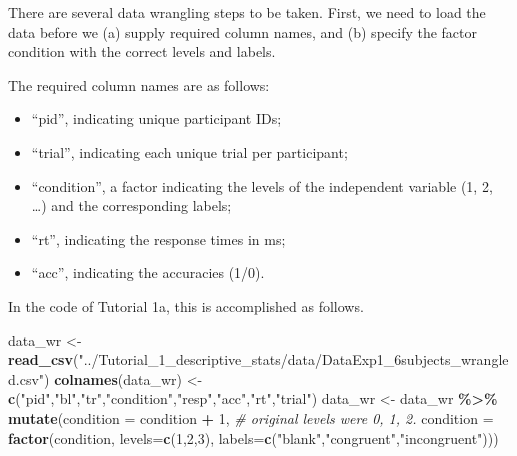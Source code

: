 \documentclass[
  man,floatsintext]{apa6}
\newenvironment{Shaded}{\begin{snugshade}}{\end{snugshade}}
\newcommand{\AttributeTok}[1]{\textcolor[rgb]{0.13,0.29,0.53}{#1}}
\newcommand{\CommentTok}[1]{\textcolor[rgb]{0.56,0.35,0.01}{\textit{#1}}}
\newcommand{\DecValTok}[1]{\textcolor[rgb]{0.00,0.00,0.81}{#1}}
\newcommand{\FunctionTok}[1]{\textcolor[rgb]{0.13,0.29,0.53}{\textbf{#1}}}
\newcommand{\NormalTok}[1]{#1}
\newcommand{\OtherTok}[1]{\textcolor[rgb]{0.56,0.35,0.01}{#1}}
\newcommand{\SpecialCharTok}[1]{\textcolor[rgb]{0.81,0.36,0.00}{\textbf{#1}}}
\newcommand{\StringTok}[1]{\textcolor[rgb]{0.31,0.60,0.02}{#1}}
\providecommand{\tightlist}{%
  \setlength{\itemsep}{0pt}\setlength{\parskip}{0pt}}
\begin{document}
There are several data wrangling steps to be taken. First, we need to load the data before we (a) supply required column names, and (b) specify the factor condition with the correct levels and labels.

The required column names are as follows:

\begin{itemize}
\tightlist
\item
  ``pid'', indicating unique participant IDs;
\item
  ``trial'', indicating each unique trial per participant;
\item
  ``condition'', a factor indicating the levels of the independent variable (1, 2, \ldots) and the corresponding labels;
\item
  ``rt'', indicating the response times in ms;
\item
  ``acc'', indicating the accuracies (1/0).
\end{itemize}

In the code of Tutorial 1a, this is accomplished as follows.

\scriptsize

\begin{Shaded}
\begin{Highlighting}[]
\NormalTok{data\_wr }\OtherTok{\textless{}{-}} \FunctionTok{read\_csv}\NormalTok{(}\StringTok{"../Tutorial\_1\_descriptive\_stats/data/DataExp1\_6subjects\_wrangled.csv"}\NormalTok{)}
\FunctionTok{colnames}\NormalTok{(data\_wr) }\OtherTok{\textless{}{-}} \FunctionTok{c}\NormalTok{(}\StringTok{"pid"}\NormalTok{,}\StringTok{"bl"}\NormalTok{,}\StringTok{"tr"}\NormalTok{,}\StringTok{"condition"}\NormalTok{,}\StringTok{"resp"}\NormalTok{,}\StringTok{"acc"}\NormalTok{,}\StringTok{"rt"}\NormalTok{,}\StringTok{"trial"}\NormalTok{) }
\NormalTok{data\_wr }\OtherTok{\textless{}{-}}\NormalTok{ data\_wr }\SpecialCharTok{\%\textgreater{}\%} 
  \FunctionTok{mutate}\NormalTok{(}\AttributeTok{condition =}\NormalTok{ condition }\SpecialCharTok{+} \DecValTok{1}\NormalTok{, }\CommentTok{\# original levels were 0, 1, 2.}
         \AttributeTok{condition =} \FunctionTok{factor}\NormalTok{(condition, }\AttributeTok{levels=}\FunctionTok{c}\NormalTok{(}\DecValTok{1}\NormalTok{,}\DecValTok{2}\NormalTok{,}\DecValTok{3}\NormalTok{), }\AttributeTok{labels=}\FunctionTok{c}\NormalTok{(}\StringTok{"blank"}\NormalTok{,}\StringTok{"congruent"}\NormalTok{,}\StringTok{"incongruent"}\NormalTok{)))}
\end{Highlighting}
\end{Shaded}
\end{document}
